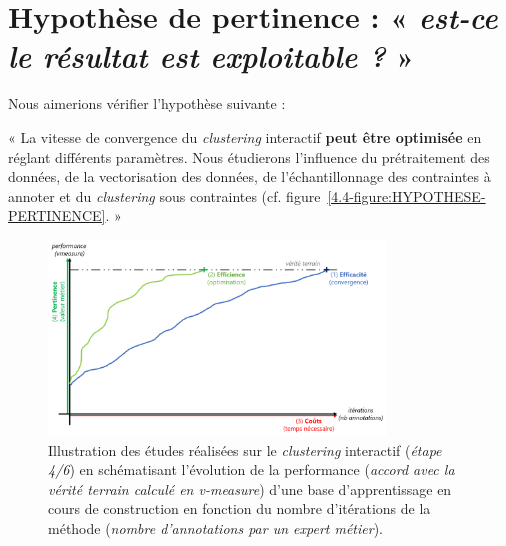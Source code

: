 \section{Hypothèse de pertinence : « \textit{est-ce le résultat est exploitable ?} »}
\label{section:4.4-HYPOTHESE-PERTINENCE}

	Nous aimerions vérifier l'hypothèse suivante :

	\begin{tcolorbox}[
		title=\faVial~\textbf{Hypothèse de pertinence}~\faVial,
		colback=colorTcolorboxHypothesis!15,  %
		colframe=colorTcolorboxHypothesis!75,  %
		width=\linewidth
	]
		« La vitesse de convergence du \textit{clustering} interactif \textbf{peut être optimisée} en réglant différents paramètres. Nous étudierons l'influence du prétraitement des données, de la vectorisation des données, de l'échantillonnage des contraintes à annoter et du \textit{clustering} sous contraintes (cf. figure~\ref{4.4-figure:HYPOTHESE-PERTINENCE}. »
		
		
		\begin{figure}[H]  %
			\centering
			\includegraphics[width=0.8\textwidth]{figures/hypotheses-04-pertinence}
			\caption{Illustration des études réalisées sur le \textit{clustering} interactif (\textit{étape 4/6}) en schématisant l'évolution de la performance (\textit{accord avec la vérité terrain calculé en v-measure}) d'une base d'apprentissage en cours de construction en fonction du nombre d'itérations de la méthode (\textit{nombre d'annotations par un expert métier}).}
			\label{figure:4.5-HYPOTHESE-PERTINENCE}
		\end{figure}

	\end{tcolorbox}
	
